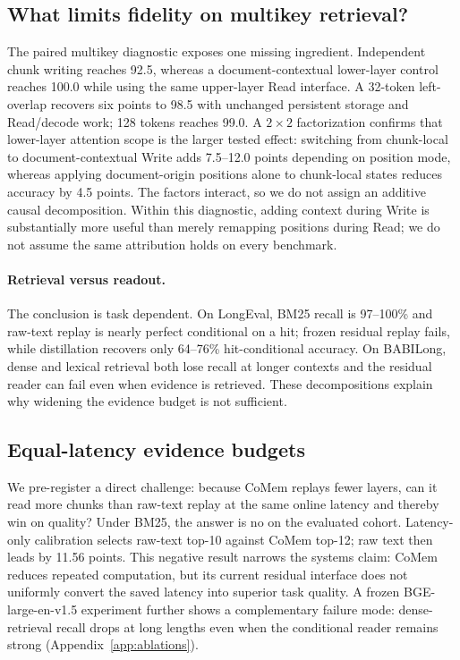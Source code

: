 \subsection{What limits fidelity on multikey retrieval?}


The paired multikey diagnostic exposes one missing ingredient. Independent
chunk writing reaches 92.5, whereas a document-contextual lower-layer control
reaches 100.0 while using the same upper-layer Read interface. A 32-token
left-overlap recovers six points to 98.5 with unchanged persistent storage and
Read/decode work; 128 tokens reaches 99.0. A $2{\times}2$ factorization confirms
that lower-layer attention scope is the larger tested effect: switching from chunk-local
to document-contextual Write adds 7.5--12.0 points depending on position mode,
whereas applying document-origin positions alone to chunk-local states reduces
accuracy by 4.5 points. The factors interact, so we do not assign an additive
causal decomposition. Within this diagnostic, adding context during Write is
substantially more useful than merely remapping positions during Read; we do not
assume the same attribution holds on every benchmark.

\paragraph{Retrieval versus readout.}
The conclusion is task dependent. On LongEval, BM25 recall is 97--100\% and
raw-text replay is nearly perfect conditional on a hit; frozen residual replay
fails, while distillation recovers only 64--76\% hit-conditional accuracy. On
BABILong, dense and lexical retrieval both lose recall at longer contexts and
the residual reader can fail even when evidence is retrieved. These
decompositions explain why widening the evidence budget is not sufficient.

\subsection{Equal-latency evidence budgets}


We pre-register a direct challenge: because CoMem replays fewer layers, can it
read more chunks than raw-text replay at the same online latency and thereby
win on quality? Under BM25, the answer is no on the evaluated cohort.
Latency-only calibration selects raw-text top-10 against CoMem top-12; raw text
then leads by 11.56 points. This negative result narrows the systems claim:
CoMem reduces repeated computation, but its current residual interface does not
uniformly convert the saved latency into superior task quality. A frozen
BGE-large-en-v1.5 experiment further shows a complementary failure mode:
dense-retrieval recall drops at long lengths even when the conditional reader
remains strong (Appendix~\ref{app:ablations}).

